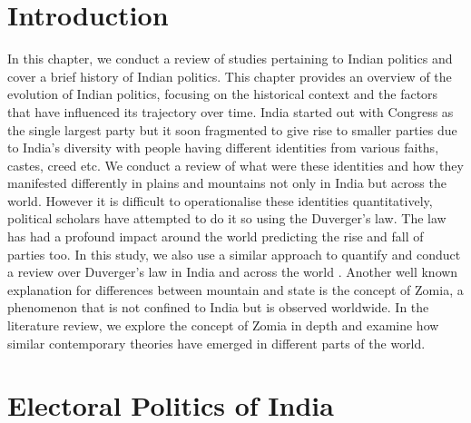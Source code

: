 \section{Introduction}
In this chapter, we conduct a review of studies pertaining to Indian politics and cover a brief history of Indian politics. This chapter provides an overview of the evolution of Indian politics, focusing on the historical context and the factors that have influenced its trajectory over time. India started out with Congress as the single largest party \citep{kothari1967india} but it soon fragmented to give rise to smaller parties due to India's diversity with people having different identities from various faiths, castes, creed etc. We conduct a review of what were these identities and how they manifested differently in plains and mountains not only in India but across the world.  However it is difficult to operationalise these identities quantitatively, political scholars have attempted to do it so using the Duverger's law. The law has had a profound impact around the world predicting the rise and fall of parties too. In this study, we also use a similar approach to quantify and conduct a review over Duverger's law in India and across the world \citep{duverger1954political}. Another well known explanation for differences between mountain and state is the concept of Zomia, a phenomenon that is not confined to India but is observed worldwide. In the literature review, we explore the concept of Zomia in depth and examine how similar contemporary theories have emerged in different parts of the world. 

\section{Electoral Politics of India}
